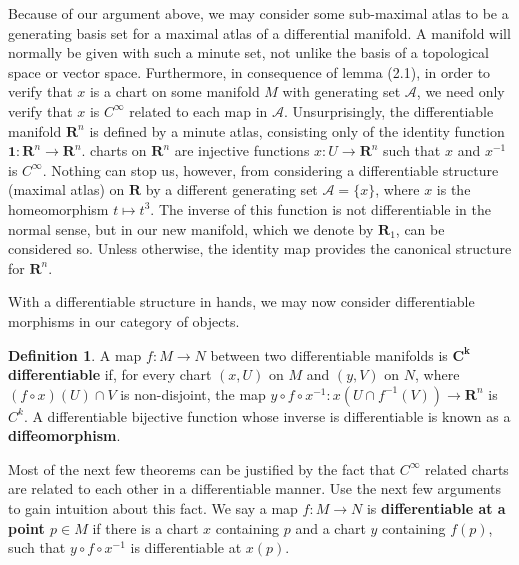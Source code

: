 \documentclass[12pt]{report}
\theoremstyle{plain}
\theoremstyle{definition}
\newtheorem*{defi}{Definition}
\newenvironment{definition}
    {\begin{samepage}\begin{framed}\begin{defi}}
    {\end{defi}\end{framed}\end{samepage}}
\begin{document}
Because of our argument above, we may consider some sub-maximal atlas to be a generating basis set for a maximal atlas of a differential manifold. A manifold will normally be given with such a minute set, not unlike the basis of a topological space or vector space. Furthermore, in consequence of lemma (2.1), in order to verify that $x$ is a chart on some manifold $M$ with generating set $\mathcal{A}$, we need only verify that $x$ is $C^\infty$ related to each map in $\mathcal{A}$. Unsurprisingly, the differentiable manifold $\mathbf{R}^n$ is defined by a minute atlas, consisting only of the identity function $\mathbf{1}:\mathbf{R}^n \to \mathbf{R}^n$. charts on $\mathbf{R}^n$ are injective functions $x:U \to \mathbf{R}^n$ such that $x$ and $x^{-1}$ is $C^\infty$. Nothing can stop us, however, from considering a differentiable structure (maximal atlas) on $\mathbf{R}$ by a different generating set $\mathcal{A} = \{ x \}$, where $x$ is the homeomorphism $t \mapsto t^3$. The inverse of this function is not differentiable in the normal sense, but in our new manifold, which we denote by $\mathbf{R}_1$, can be considered so. Unless otherwise, the identity map provides the canonical structure for $\mathbf{R}^n$.

With a differentiable structure in hands, we may now consider differentiable morphisms in our category of objects.

\begin{definition}
    A map $f:M \to N$ between two differentiable manifolds is {\bf $\mathbf{C^k}$ differentiable} if, for every chart $(x,U)$ on $M$ and $(y,V)$ on $N$, where $(f \circ x)(U) \cap V$ is non-disjoint, the map $y \circ f \circ x^{-1}: x(U \cap f^{-1}(V)) \to \mathbf{R}^n$ is $C^k$. A differentiable bijective function whose inverse is differentiable is known as a {\bf diffeomorphism}.
\end{definition}

Most of the next few theorems can be justified by the fact that $C^\infty$ related charts are related to each other in a differentiable manner. Use the next few arguments to gain intuition about this fact. We say a map $f:M \to N$ is {\bf differentiable at a point $p \in M$} if there is a chart $x$ containing $p$ and a chart $y$ containing $f(p)$, such that $y \circ f \circ x^{-1}$ is differentiable at $x(p)$.
\end{document}
